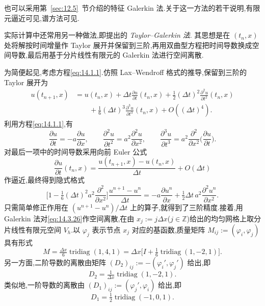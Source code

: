 也可以采用第~\ref{sec:12.5}~节介绍的特征 Galerkin 法.关于这一方法的若干说明,有限元逼近可见,谱方法可见.

实际计算中还常用另一种做法,即提出的 \emph{Taylor--Galerkin 法}.
其思想是在 \((t_n,x)\) 处将解按时间增量作 Taylor 展开并保留到三阶,再用双曲型方程把时间导数换成空间导数,最后用基于分片线性有限元的 Galerkin 法进行空间离散.

为简便起见,考虑方程\eqref{eq:14.1.1}.仿照 Lax--Wendroff 格式的推导,保留到三阶的 Taylor 展开为
\[
  \begin{aligned}
    u(t_{n+1},x)
       &=u(t_n,x)+\Delta t\frac{\partial u}{\partial t}(t_n,x)
           +\tfrac12(\Delta t)^2\frac{\partial^2u}{\partial t^2}(t_n,x)\\
       &\qquad+\tfrac16(\Delta t)^3\frac{\partial^3u}{\partial t^3}(t_n,x)
           +O((\Delta t)^4).
  \end{aligned}
\]
利用方程\eqref{eq:14.1.1},有
\[
  \frac{\partial u}{\partial t}=-a\frac{\partial u}{\partial x},\qquad
  \frac{\partial^2u}{\partial t^2}=a^2\frac{\partial^2u}{\partial x^2},\qquad
  \frac{\partial^3u}{\partial t^3}
    =a^2\frac{\partial^2}{\partial x^2}\biggl(\frac{\partial u}{\partial t}\biggr).
\]
对最后一项中的时间导数采用向前 Euler 公式
\[
  \frac{\partial u}{\partial t}(t_n,x)
    =\frac{u(t_{n+1},x)-u(t_n,x)}{\Delta t}+O(\Delta t)
\]
作逼近,最终得到隐式格式
\begin{equation}\label{eq:14.3.26}
  \biggl[1-\tfrac16(\Delta t)^2a^2\frac{\partial^2}{\partial x^2}\biggr]
     \frac{u^{n+1}-u^n}{\Delta t}
     =-a\frac{\partial u^n}{\partial x}
       +\tfrac12\Delta t\,a^2\frac{\partial^2u^n}{\partial x^2}.
\end{equation}
只需简单修正作用在 \((u^{n+1}-u^n)/\Delta t\) 上的算子,就得到了三阶精度.接着,用 Galerkin 法对\eqref{eq:14.3.26}作空间离散,在由 \(x_j:=j\Delta x\)(\(j\in\mathbb Z\))给出的均匀网格上取分片线性有限元空间 \(V_h\).以 \(\varphi_j\) 表示节点 \(x_j\) 对应的基函数,质量矩阵 \(M_{ij}:=(\varphi_i,\varphi_j)\) 具有形式
\[
  M=\tfrac{\Delta x}{6}\operatorname{tridiag}(1,4,1)
      =\Delta x\bigl[I+\tfrac16\operatorname{tridiag}(1,-2,1)\bigr].
\]
另一方面,二阶导数的离散由矩阵 \((D_2)_{ij}:=-(\varphi_i',\varphi_j')\) 给出,即
\[
  D_2=\tfrac1{\Delta x}\operatorname{tridiag}(1,-2,1).
\]
类似地,一阶导数的离散由 \((D_1)_{ij}:=(\varphi_j',\varphi_i)\) 给出,即
\[
  D_1=\tfrac12\operatorname{tridiag}(-1,0,1).
\]


